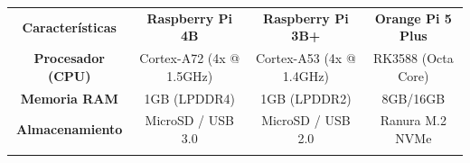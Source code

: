 \begin{table}[H]
    \centering
    \setlength{\tabcolsep}{3pt}
    \renewcommand{\arraystretch}{1.2}
    \begin{tabular}{|c|c|c|c|}
        \hhline{|-|-|-|-|}
        \rowcolor[gray]{0.9} 
        \parbox[c]{4.6cm}{\vspace{0.2cm}\centering\textbf{Características}\vspace{0.2cm}} & \parbox[c]{2.9cm}{\vspace{0.2cm}\centering\textbf{Raspberry Pi 4B}\vspace{0.2cm}} & \parbox[c]{2.9cm}{\vspace{0.2cm}\centering\textbf{Raspberry Pi 3B+}\vspace{0.2cm}} & \parbox[c]{2.9cm}{\vspace{0.2cm}\centering\textbf{Orange Pi 5 Plus}\vspace{0.2cm}} \\ \hhline{|-|-|-|-|}
        \parbox[c]{4.6cm}{\vspace{0.2cm}\centering\textbf{Procesador (CPU)}\vspace{0.2cm}} & \parbox[c]{2.9cm}{\vspace{0.2cm}\centering Cortex-A72 (4x @ 1.5GHz)\vspace{0.2cm}} & \parbox[c]{2.9cm}{\vspace{0.2cm}\centering Cortex-A53 (4x @ 1.4GHz)\vspace{0.2cm}} & \parbox[c]{2.9cm}{\vspace{0.2cm}\centering RK3588 (Octa Core)\vspace{0.2cm}} \\ \hhline{|-|-|-|-|}
        \parbox[c]{4.6cm}{\vspace{0.2cm}\centering\textbf{Memoria RAM}\vspace{0.2cm}} & \parbox[c]{2.9cm}{\vspace{0.2cm}\centering 1GB (LPDDR4)\vspace{0.2cm}} & \parbox[c]{2.9cm}{\vspace{0.2cm}\centering 1GB (LPDDR2)\vspace{0.2cm}} & \parbox[c]{2.9cm}{\vspace{0.2cm}\centering 8GB/\allowbreak 16GB\vspace{0.2cm}} \\ \hhline{|-|-|-|-|}
        \parbox[c]{4.6cm}{\vspace{0.2cm}\centering\textbf{Almacenamiento}\vspace{0.2cm}} & \parbox[c]{2.9cm}{\vspace{0.2cm}\centering MicroSD / USB 3.0\vspace{0.2cm}} & \parbox[c]{2.9cm}{\vspace{0.2cm}\centering MicroSD / USB 2.0\vspace{0.2cm}} & \parbox[c]{2.9cm}{\vspace{0.2cm}\centering Ranura M.2 NVMe\vspace{0.2cm}} \\ \hhline{|-|-|-|-|}

\end{tabular}
\end{table}

